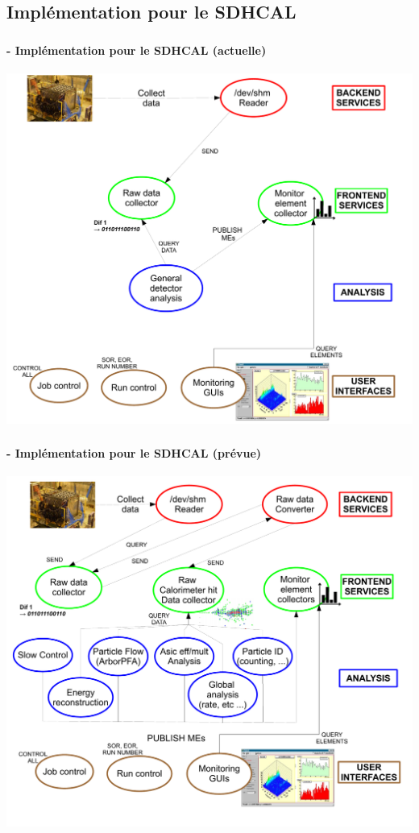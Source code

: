 \documentclass[8pt]{beamer}
\begin{document}
  

  

  
  
  
  \subsection{Implémentation pour le SDHCAL}  

  \begin{frame}
  \frametitle{\secname}
  \framesubtitle{\subsecname - Implémentation pour le SDHCAL (actuelle)}
    \begin{center}
      \includegraphics[width=0.8\linewidth]{dqm_sdhcal_current_impl.pdf}    
    \end{center}
  \end{frame}
  
  
  \begin{frame}
  \frametitle{\secname}
  \framesubtitle{\subsecname - Implémentation pour le SDHCAL (prévue)}
    \begin{center}
      \includegraphics[width=0.85\linewidth]{dqm_sdhcal_future_impl.pdf}    
    \end{center}
  \end{frame}
      
\end{document}
